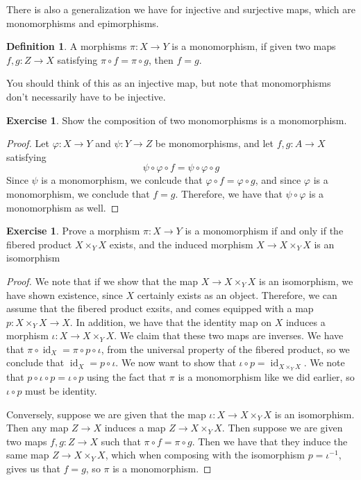 \documentclass[psamsfonts]{amsart}
\theoremstyle{definition}
\newtheorem{defn}[thm]{Definition}
\newtheorem{exer}[thm]{Exercise}
\theoremstyle{remark}
\newcommand{\inv}{^{-1}}
\DeclareMathOperator{\id}{id}
\begin{document}
There is also a generalization we have for injective and surjective maps, which are monomorphisms and epimorphisms.
%
\begin{defn}
A morphisms $\pi : X \to Y$ is a monomorphism, if given two maps $f,g : Z \to X$ satisfying $\pi \circ f = \pi \circ g$, then $f = g$.
\end{defn}
%
You should think of this as an injective map, but note that monomorphisms don't necessarily have to be injective.
%
\begin{exer}
Show the composition of two monomorphisms is a monomorphism.
\end{exer}
%
\begin{proof}
Let $\varphi: X \to Y$ and $\psi : Y \to Z$ be monomorphisms, and let $f,g: A \to X$ satisfying 
$$\psi \circ \varphi \circ f = \psi \circ \varphi \circ g$$
Since $\psi$ is a monomorphism, we conlcude that $\varphi \circ f = \varphi \circ g$, and since $\varphi$ is a monomorphism, we conclude that $f = g$. Therefore, we have that $\psi \circ \varphi$ is a monomorphism as well.
\end{proof}
%
\begin{exer}
Prove a morphism $\pi : X \to Y$ is a monomorphism if and only if the fibered product $X \times_Y X$ exists, and the induced morphism $X \to X \times_Y X$ is an isomorphism
\end{exer}
%
\begin{proof}
We note that if we show that the map $X \to X \times_Y X$ is an isomorphism, we have shown existence, since $X$ certainly exists as an object. Therefore, we can assume that the fibered product exsits, and comes equipped with a map $p: X \times_Y X \to X$. In addition, we have that the identity map on $X$ induces a morphism $\iota: X \to X \times_Y X$. We claim that these two maps are inverses. We have that $\pi \circ \id_X = \pi \circ p \circ \iota$, from the universal property of the fibered product, so we conclude that $\id_X = p \circ \iota$. We now want to show that $\iota \circ p= \id_{X \times_Y X}$. We note that $p \circ \iota \circ p = \iota \circ p$ using the fact that $\pi$ is a monomorphism like we did earlier, so $\iota \circ p$ must be identity.

Conversely, suppose we are given that the map $\iota : X \to X \times_Y X$ is an isomorphism. Then any map $Z \to X$ induces a map $Z \to X \times_Y X$. Then suppose we are given two maps $f,g: Z \to X$ such that $\pi \circ f = \pi \circ g$. Then we have that they induce the same map $Z \to X \times_Y X$, which when composing with the isomorphism $p = \iota\inv$, gives us that $f = g$, so $\pi$ is a monomorphism.
\end{proof}
\end{document}
